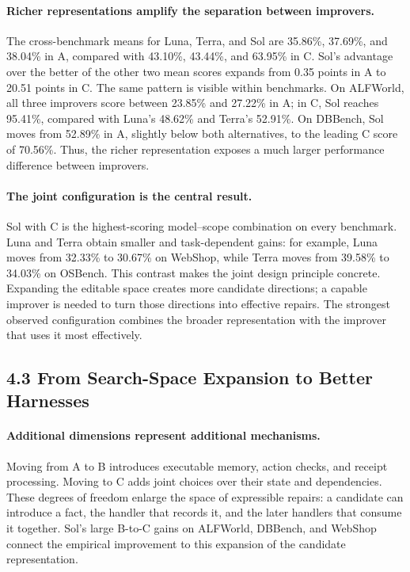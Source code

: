 \paragraph{Richer representations amplify the separation between improvers.}
The cross-benchmark means for Luna, Terra, and Sol are 35.86\%, 37.69\%, and 38.04\% in A, compared with 43.10\%, 43.44\%, and 63.95\% in C. Sol's advantage over the better of the other two mean scores expands from 0.35 points in A to 20.51 points in C. The same pattern is visible within benchmarks. On ALFWorld, all three improvers score between 23.85\% and 27.22\% in A; in C, Sol reaches 95.41\%, compared with Luna's 48.62\% and Terra's 52.91\%. On DBBench, Sol moves from 52.89\% in A, slightly below both alternatives, to the leading C score of 70.56\%. Thus, the richer representation exposes a much larger performance difference between improvers.

\paragraph{The joint configuration is the central result.}
Sol with C is the highest-scoring model--scope combination on every benchmark. Luna and Terra obtain smaller and task-dependent gains: for example, Luna moves from 32.33\% to 30.67\% on WebShop, while Terra moves from 39.58\% to 34.03\% on OSBench. This contrast makes the joint design principle concrete. Expanding the editable space creates more candidate directions; a capable improver is needed to turn those directions into effective repairs. The strongest observed configuration combines the broader representation with the improver that uses it most effectively.

\subsection*{4.3 From Search-Space Expansion to Better Harnesses}
\paragraph{Additional dimensions represent additional mechanisms.}
Moving from A to B introduces executable memory, action checks, and receipt processing. Moving to C adds joint choices over their state and dependencies. These degrees of freedom enlarge the space of expressible repairs: a candidate can introduce a fact, the handler that records it, and the later handlers that consume it together. Sol's large B-to-C gains on ALFWorld, DBBench, and WebShop connect the empirical improvement to this expansion of the candidate representation.

